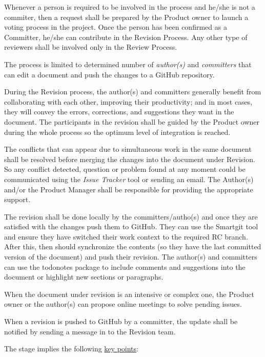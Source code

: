 \documentclass{template/openetcs_article}
\begin{document}
Whenever a person is required to be involved in the process and he/she is not a commiter, then a request shall be prepared by the Product owner to launch a voting process in the project. Once the person has been confirmed as a Committer, he/she can contribute in the Revision Process. Any other type of reviewers shall be involved only in the Review Process. 

The process is limited to determined number of {\it author(s)} and {\it committers} that can edit a document and push the changes to a GitHub repository. 

During the Revision process, the author(s) and committers generally benefit
from collaborating with each other, improving their productivity; and in most cases, they will convey the errors, corrections, and suggestions they want in the document. The participants in the revision shall be guided by the Product owner during the whole process so the optimum level of integration is reached. 

The conflicts that can appear due to simultaneous work in the same document shall be resolved before merging the changes into the document under Revision. So any conflict detected, question or problem found at any moment could be communicated using the {\it Issue Tracker} tool or sending an email. The Author(s) and/or the Product Manager shall be responsible for providing the appropriate support.

The revision shall be done locally by the committers/autho(s) and once they are satisfied with the changes push them to GitHub. They can use the Smartgit tool and  ensure they have switched their work context to the required RC branch. After this, then should synchronize the contents (so they have the last committed version of the document) and push their revision. The author(s) and committers can use
the todonotes package to include comments and suggestions into the document or highlight new sections or paragraphs.

When the document under revision is an intensive or complex one, the Product owner or the author(s) can propose online meetings to solve pending issues.  

When a revision is pushed to GitHub by a committer, the update shall be notified by sending a message in to the Revision team.

The stage implies the following \underline{key points}:
\end{document}
